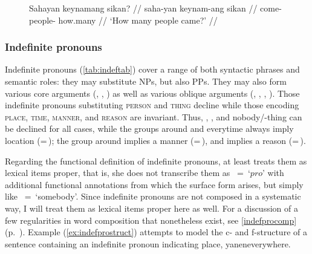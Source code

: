 \begin{figure}
\ex\label{ex:sikanadj}%
\begingl
	\gla Sahayan keynamang sikan? //
	\glb saha-yan keynam-ang sikan //
	\glc come-\TplM{} people-\Aarg{} how.many //
	\glft `How many people came?' //
\endgl
\xe
\end{figure}


\subsubsection{Indefinite pronouns}

Indefinite pronouns (\autoref{tab:indeftab}) cover a range of both syntactic
phrases and semantic roles: they may substitute NPs, but also PPs. They may
also form various core arguments (\Subj{}, \Obj{}, ) as well as
various oblique arguments (\Possr{}, , , ).
Those indefinite pronouns substituting \textsc{person} and \textsc{thing}
decline while those encoding \textsc{place}, \textsc{time}, \textsc{manner},
and \textsc{reason} are invariant. Thus, , , and
 {nobody/\mbox{-thing}} can be declined for all cases, while
the groups around  and 
{everytime} always imply location (=\,\Loc{}); the group around
 implies a manner (=\,\Ins{}), and
 implies a reason (=\,\Caus{}).

Regarding the functional definition of indefinite pronouns, at least
\citet{dalrymple2001} treats them as lexical items proper, that is, she does
not transcribe them as \ups{\Pred{}}~=~`$pro$' with additional functional
annotations from which the surface form arises, but simply like
\ups{\Pred{}}~=~`somebody'. Since indefinite pronouns are not composed in a
systematic way, I will treat them as lexical items proper here as well. For a
discussion of a few regularities in word composition that nonetheless exist,
see \autoref{indefprocomp} (p.~\pageref{indefprocomp}). Example
(\ref{ex:indefprostruct}) attempts to model the c- and f-structure of a
sentence containing an indefinite pronoun indicating place, 
{yanen}{everywhere}.

